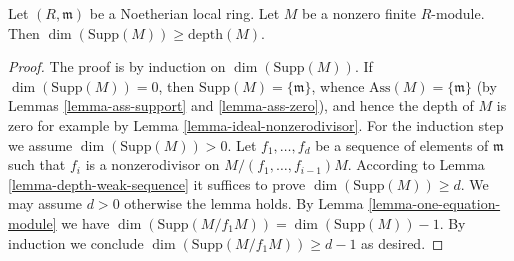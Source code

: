 \begin{lemma}
\label{lemma-bound-depth}
Let $(R, \mathfrak m)$ be a Noetherian local ring.
Let $M$ be a nonzero finite $R$-module.
Then $\dim(\text{Supp}(M)) \geq \text{depth}(M)$.
\end{lemma}

\begin{proof}
The proof is by induction on $\dim(\text{Supp}(M))$.
If $\dim(\text{Supp}(M)) = 0$, then
$\text{Supp}(M) = \{\mathfrak m\}$, whence $\text{Ass}(M) = \{\mathfrak m\}$
(by Lemmas \ref{lemma-ass-support} and \ref{lemma-ass-zero}), and hence
the depth of $M$ is zero for example by
Lemma \ref{lemma-ideal-nonzerodivisor}.
For the induction step we assume $\dim(\text{Supp}(M)) > 0$.
Let $f_1, \ldots, f_d$ be a sequence of elements of $\mathfrak m$
such that $f_i$ is a nonzerodivisor on $M/(f_1, \ldots, f_{i - 1})M$.
According to Lemma \ref{lemma-depth-weak-sequence} it suffices to prove
$\dim(\text{Supp}(M)) \geq d$. We may assume
$d > 0$ otherwise the lemma holds. By
Lemma \ref{lemma-one-equation-module}
we have $\dim(\text{Supp}(M/f_1M)) = \dim(\text{Supp}(M)) - 1$.
By induction we conclude $\dim(\text{Supp}(M/f_1M)) \geq d - 1$
as desired.
\end{proof}
